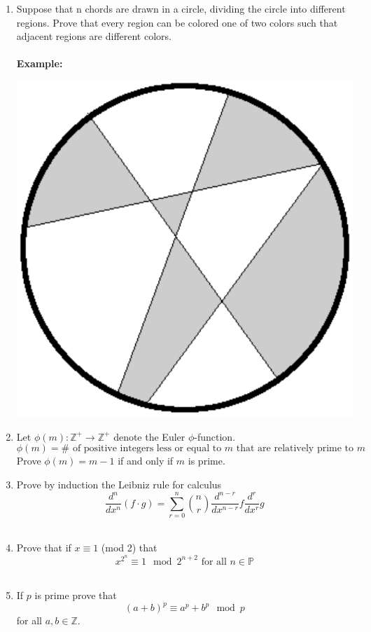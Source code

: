 \documentclass[12pt,letterpaper]{article}
\theoremstyle{plain}
\theoremstyle{definition}
\begin{document}
\begin{enumerate}[1.]
\item Suppose that n chords are drawn in a circle, dividing the circle into different regions.
Prove that every region can be colored one of two colors such that adjacent regions are
different colors. \\
\ \\
{\bf Example: }
\begin{center}
\includegraphics[scale=0.25]{circle}
\end{center}
\item Let $\phi(m):\mathbb{Z}^+\rightarrow \mathbb{Z}^+$ denote the Euler $\phi$-function. 
\[\phi(m)=\#\text{ of positive integers less or equal to } m \text{ that are relatively prime to }m\]
Prove $\phi(m)=m-1$ if and only if $m$ is prime. 
\ \\
\item Prove by induction the Leibniz rule for calculus 
\[\dfrac{d^n}{dx^n}(f\cdot g) =\sum_{r=0}^n {n \choose r} \dfrac{d^{n-r}}{dx^{n-r}}f \dfrac{d^r}{dx^r}g\]
\ \\
\item Prove that if $x\equiv 1 $ (mod 2) that 
\[x^{2^n}\equiv 1 \mod 2^{n+2} \text{ for all }n\in \mathbb{P}\]
\ \\
\item If $p$ is prime prove that 
\[(a+b)^p\equiv a^p+b^p \mod p \]
for all $a,b\in \mathbb{Z}$.

\end{enumerate}
\end{document}
